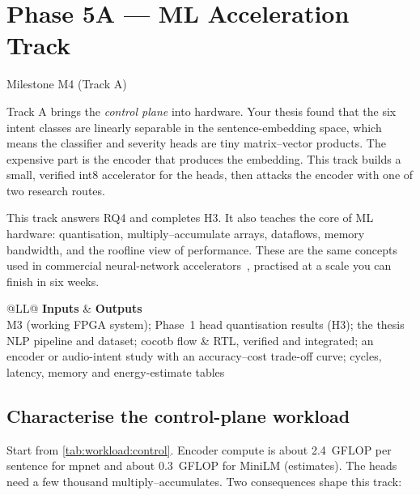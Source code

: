 \chapter{Phase 5A --- ML Acceleration Track}\label{ch:mlaccel}

 \quad Milestone M4 (Track A)

Track A brings the \emph{control plane} into hardware. Your thesis found that
the six intent classes are linearly separable in the sentence-embedding space,
which means the classifier and severity heads are tiny matrix--vector products.
The expensive part is the encoder that produces the embedding. This track
builds a small, verified int8 accelerator for the heads, then attacks the
encoder with one of two research routes.

\begin{whybox}
This track answers RQ4 and completes H3. It also teaches the core of ML
hardware: quantisation, multiply--accumulate arrays, dataflows, memory
bandwidth, and the roofline view of performance. These are the same concepts
used in commercial neural-network accelerators~\cite{sze2017efficient,jouppi2017tpu},
practised at a scale you can finish in six weeks.
\end{whybox}

\begin{center}\small
\begin{tabularx}{\textwidth}{@{}LL@{}}
\toprule
\textbf{Inputs} & \textbf{Outputs} \\
\midrule
M3 (working FPGA system); Phase~1 head quantisation results (H3); the thesis
NLP pipeline and dataset; cocotb flow
&  RTL, verified and integrated; an encoder or audio-intent
study with an accuracy--cost trade-off curve; cycles, latency, memory and
energy-estimate tables \\
\bottomrule
\end{tabularx}
\end{center}

\section{Characterise the control-plane workload}\label{sec:ml:workload}

Start from \cref{tab:workload:control}. Encoder compute is about 2.4~GFLOP per
sentence for mpnet and about 0.3~GFLOP for MiniLM (estimates). The heads need a
few thousand multiply--accumulates. Two consequences shape this track:

